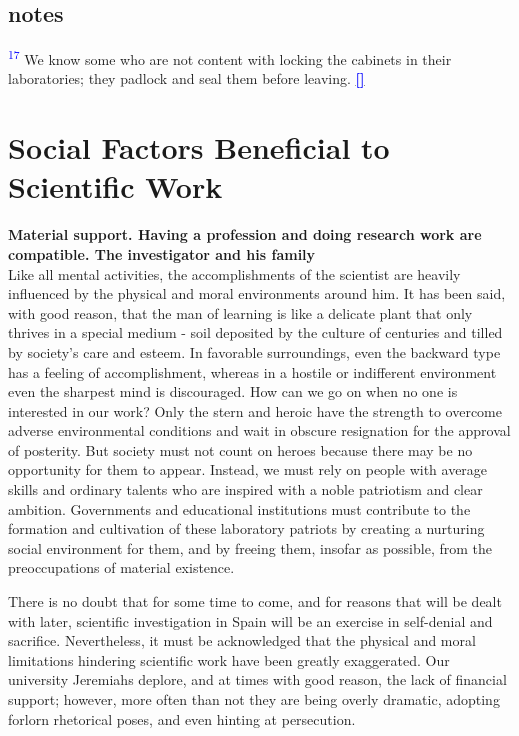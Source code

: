 \documentclass{article}
\newcommand{\boldline}[1]{%
 \vspace{\baselineskip}%
 \noindent\textbf{#1}\\[0.5\baselineskip]%
}
\newcommand{\notetext}[2]{
 \par\noindent
 \hypertarget{note:#1}{\textsuperscript{\textcolor{blue}{#1}}} #2
 \hyperlink{ref:#1}{\textcolor{blue}{\textbf{[\textuparrow]}}}
 \par\vspace{1em}
}
\begin{document}
\subsection*{notes}


\notetext{17}{ We know some who are not content with locking the cabinets in their laboratories; they padlock and seal them before leaving. }

\newpage \section{Social Factors Beneficial to Scientific Work}

\boldline{Material support. Having a profession and doing research work are compatible. The investigator and his family}

Like all mental activities, the accomplishments of the scientist are heavily influenced by the physical and moral environments around him. It has been said, with good reason, that the man of learning is like a delicate plant that only thrives in a special medium - soil deposited by the culture of centuries and tilled by society’s care and esteem. In favorable surroundings, even the backward type has a feeling of accomplishment, whereas in a hostile or indifferent environment even the sharpest mind is discouraged. How can we go on when no one is interested in our work? Only the stern and heroic have the strength to overcome adverse environmental conditions and wait in obscure resignation for the approval of posterity. But society must not count on heroes because there may be no opportunity for them to appear. Instead, we must rely on people with average skills and ordinary talents who are inspired with a noble patriotism and clear ambition. Governments and educational institutions must contribute to the formation and cultivation of these laboratory patriots by creating a nurturing social environment for them, and by freeing them, insofar as possible, from the preoccupations of material existence.

There is no doubt that for some time to come, and for reasons that will be dealt with later, scientific investigation in Spain will be an exercise in self-denial and sacrifice. Nevertheless, it must be acknowledged that the physical and moral limitations hindering scientific work have been greatly exaggerated. Our university Jeremiahs deplore, and at times with good reason, the lack of financial support; however, more often than not they are being overly dramatic, adopting forlorn rhetorical poses, and even hinting at persecution.
\end{document}
